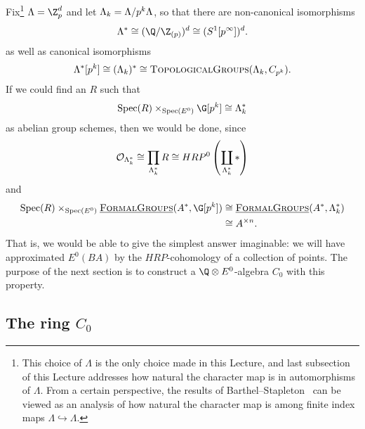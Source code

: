 Fix\footnote{This choice of \(\Lambda\) is the only choice made in this Lecture, and last subsection of this Lecture addresses how natural the character map is in automorphisms of \(\Lambda\).  From a certain perspective, the results of Barthel--Stapleton~\cite{BarthelStapleton} can be viewed as an analysis of how natural the character map is among finite index maps \(\Lambda \hookrightarrow \Lambda\).} \(\Lambda = \Z_{p}^{d}\) and let \(\Lambda_k = \Lambda/p^k\Lambda\), so that there are non-canonical isomorphisms
\[
\Lambda^* \cong (\Q/\Z_{(p)})^d \cong (S^1[p^{\infty}])^d.
\] 
as well as canonical isomorphisms
\[
\Lambda^*[p^k] \cong (\Lambda_{k})^* \cong \normalfont\textsc{TopologicalGroups}(\Lambda_k, C_{p^k}).
\]
If we could find an \(R\) such that
\[
\Spec(R) \times_{\Spec(E^0)} \G[p^k] \cong \Lk^*
\]
as abelian group schemes, then we would be done, since
\[
\mathcal{O}_{\Lambda_k^*} \cong \prod_{\Lambda_k^*} R \cong HRP^0\left(\coprod_{\Lambda_k^*} \ast\right)
\]
and
\begin{align*}
\Spec(R) \times_{\Spec(E^0)} \InternalHom{FormalGroups}(A^*, \G[p^k]) & \cong \InternalHom{FormalGroups}(A^*, \Lambda_{k}^*) \\
& \cong A^{\times n}.
\end{align*}
That is, we would be able to give the simplest answer imaginable: we will have approximated \(E^0(BA)\) by the \(HRP\)-cohomology of a collection of points. The purpose of the next section is to construct a \(\Q \otimes E^0\)-algebra \(C_0\) with this property.




\subsection*{The ring \(C_0\)}



